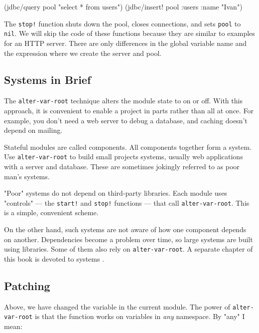 \else

\begin{clojure}
(jdbc/query pool "select * from users")
(jdbc/insert! pool :users {:name "Ivan"})
\end{clojure}

\fi

The \verb|stop!| function shuts down the pool, closes connections, and sets \verb|pool| to \verb|nil|.
We will skip the code of these functions because they are similar to examples for an HTTP server.
There are only differences in the global variable name and the expression where we create the server and pool.

\subsection{Systems in Brief}


\label{systems-intro}

The \verb|alter-var-root| technique alters the module state to on or off. With this approach, it is convenient to enable a project in parts rather than all at once. For example, you don't need a web server to debug a database, and caching doesn't depend on mailing.

Stateful modules are called components.
All components together form a system.
Use \verb|alter-var-root| to build small projects systems, usually web applications with a server and database. These are sometimes jokingly referred to as poor man's systems.


"Poor" systems do not depend on third-party libraries.
Each module uses "controls" — the \verb|start!| and \verb|stop!| functions — that call \verb|alter-var-root|.
This is a simple, convenient scheme.

On the other hand, such systems are not aware of how one component depends on another.
Dependencies become a problem over time, so large systems are built using libraries.
Some of them also rely on \verb|alter-var-root|.
A separate chapter of this book is devoted to systems .

\subsection{Patching}


Above, we have changed the variable in the current module.
The power of \verb|alter-var-root| is that the function works on variables in \emph{any} namespace. By "any" I mean:

